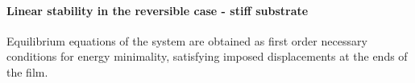 \paragraph{Linear stability in the reversible case - stiff substrate}




Equilibrium equations of the system are obtained as first order necessary conditions for energy minimality, satisfying imposed displacements at the ends of the film.

